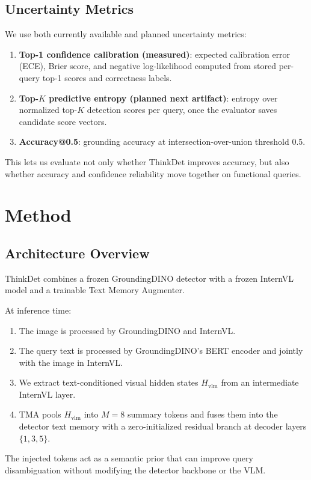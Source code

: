 \documentclass{uai2026} %
\begin{document}
\subsection{Uncertainty Metrics}
We use both currently available and planned uncertainty metrics:
\begin{enumerate}
\item \textbf{Top-1 confidence calibration (measured)}: expected calibration error (ECE), Brier score, and negative log-likelihood computed from stored per-query top-1 scores and correctness labels.
\item \textbf{Top-\(K\) predictive entropy (planned next artifact)}: entropy over normalized top-\(K\) detection scores per query, once the evaluator saves candidate score vectors.
\item \textbf{Accuracy@0.5}: grounding accuracy at intersection-over-union threshold 0.5.
\end{enumerate}

This lets us evaluate not only whether ThinkDet improves accuracy, but also whether accuracy and confidence reliability move together on functional queries.

\section{Method}\label{sec:method}
\subsection{Architecture Overview}
ThinkDet combines a frozen GroundingDINO detector with a frozen InternVL model \citep{internvl2024} and a trainable Text Memory Augmenter.

At inference time:
\begin{enumerate}
\item The image is processed by GroundingDINO and InternVL.
\item The query text is processed by GroundingDINO's BERT encoder and jointly with the image in InternVL.
\item We extract text-conditioned visual hidden states \(H_{\text{vlm}}\) from an intermediate InternVL layer.
\item TMA pools \(H_{\text{vlm}}\) into \(M=8\) summary tokens and fuses them into the detector text memory with a zero-initialized residual branch at decoder layers \(\{1,3,5\}\).
\end{enumerate}

The injected tokens act as a semantic prior that can improve query disambiguation without modifying the detector backbone or the VLM.
\end{document}

